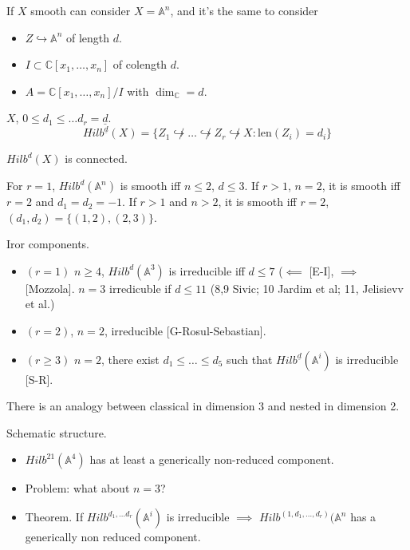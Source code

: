 If $X$ smooth can consider $X=\mathbb{A}^n$,
and it's the same to consider
\begin{itemize}
\item $Z \hookrightarrow \mathbb{A}^n$ of
length $d$.
\item $I \subset \mathbb{C}[x_1,\ldots,x_n]$
of
colength $d$.
\item $A= \mathbb{C}[x_1,\ldots,x_n]/I$ with
$\dim_\mathbb{C}=d$.
\end{itemize}

\begin{definition}
\label{definition-nested-hilbert-scheme}
$X$, $0 \leq d_1 \leq \ldots
d_r=\underline{d}$.
$$
Hilb^{\underline{d}}(X)=
\{Z_1\not\hookrightarrow
\ldots
\not\hookrightarrow Z_r  \not\hookrightarrow
X:
\text{len}(Z_i)=d_i\}
$$
\end{definition}

\begin{theorem}[Hartshorne (r=0), Fogarty,
Kalpan (r>1)]
\label{theorem-hk}
$Hilb^d(X)$ is connected.
\end{theorem}

For $r=1$, $Hilb^d(\mathbb{A}^n)$ is smooth
iff
$n \leq 2$, $d \leq 3$.
If $r>1$, $n=2$, it is smooth iff $r=2$ and
$d_1=d_2=-1$.
If $r>1$ and $n>2$, it is smooth iff $r=2$,
$(d_1,d_2)=\{(1,2),(2,3)\}$.

Iror components.
\begin{itemize}
\item $(r=1)$ $n\geq 4$,
$Hilb^d(\mathbb{A}^3)$
is irreducible iff $d\leq 7$ ($\impliedby$
[E-I], $\implies $ [Mozzola].
$n=3$ irredicuble if $d \leq  11$ (8,9 Sivic;
10 Jardim et al; 11, Jelisievv et
al.)
\item $(r=2)$, $n=2$, irreducible
[G-Rosul-Sebastian].
\item $(r \geq 3)$ $n=2$, there exist $d_1
\leq \ldots \leq d_5$
such that
$Hilb^{\underline{d}}(\mathbb{A}^i)$ is
irreducible [S-R].
\end{itemize}

There is an analogy between classical in
dimension 3
and nested in dimension 2.

Schematic structure.
\begin{itemize}
\item [I] $Hilb^{21}(\mathbb{A}^4)$ has at
least a generically
non-reduced component.
\item Problem: what about $n=3$?
\item Theorem. If $Hilb^{d_1,\ldots
d_r}(\mathbb{A}^i)$ is
irreducible $\implies $
$Hilb^{(1,d_1,\ldots,d_r)}(\mathbb{A}^n$
has a generically non reduced component.
\end{itemize}


